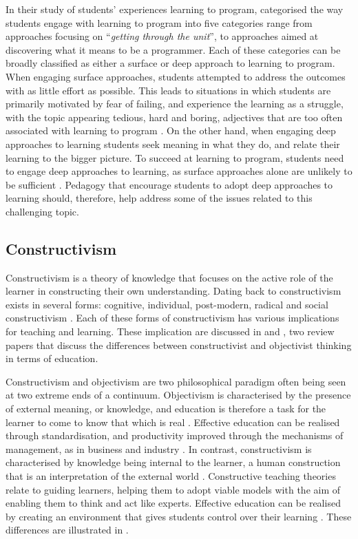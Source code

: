 In their study of students' experiences learning to program, \citet{Bruce:2003} categorised the way students engage with learning to program into five categories range from approaches focusing on ``\emph{getting through the unit}'', to approaches aimed at discovering what it means to be a programmer. Each of these categories can be broadly classified as either a surface or deep approach to learning to program. When engaging surface approaches, students attempted to address the outcomes with as little effort as possible. This leads to situations in which students are primarily motivated by fear of failing, and experience the learning as a struggle, with the topic appearing tedious, hard and boring, adjectives that are too often associated with learning to program \cite{McGettrick:2005}. On the other hand, when engaging deep approaches to learning students seek meaning in what they do, and relate their learning to the bigger picture. To succeed at learning to program, students need to engage deep approaches to learning, as surface approaches alone are unlikely to be sufficient \cite{Bruce:2003}. Pedagogy that encourage students to adopt deep approaches to learning should, therefore, help address some of the issues related to this challenging topic.



\subsection{Constructivism} %
\label{sub:constructivism}

Constructivism is a theory of knowledge that focuses on the active role of the learner in constructing their own understanding. Dating back to \citet{Piaget:1950} constructivism exists in several forms: cognitive, individual, post-modern, radical and social constructivism \cite{Phillips:1995,Steffe:1995}. Each of these forms of constructivism has various implications for teaching and learning. These implication are discussed in \citet{Jonassen:1991} and \citet{Vrasidas:2000}, two review papers that discuss the differences between constructivist and objectivist thinking in terms of education.

Constructivism and objectivism are two philosophical paradigm often being seen at two extreme ends of a continuum. Objectivism is characterised by the presence of external meaning, or knowledge, and education is therefore a task for the learner to come to know that which is real \cite{Jonassen:1991,Vrasidas:2000}. Effective education can be realised through standardisation, and productivity improved through the mechanisms of management, as in business and industry \cite{Tyler:1969,Vrasidas:2000}. In contrast, constructivism is characterised by knowledge being internal to the learner, a human construction that is an interpretation of the external world \cite{Jonassen:1991,Vrasidas:2000}. Constructive teaching theories relate to guiding learners, helping them to adopt viable models with the aim of enabling them to think and act like experts. Effective education can be realised by creating an environment that gives students control over their learning \cite{Vrasidas:2000}. These differences are illustrated in .

